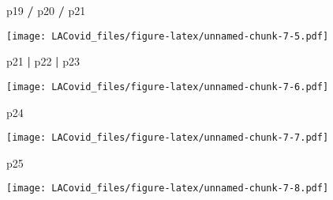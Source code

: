 \documentclass[
]{article}
\newenvironment{Shaded}{\begin{snugshade}}{\end{snugshade}}
\newcommand{\NormalTok}[1]{#1}
\newcommand{\OperatorTok}[1]{\textcolor[rgb]{0.81,0.36,0.00}{\textbf{#1}}}
\newcommand{\StringTok}[1]{\textcolor[rgb]{0.31,0.60,0.02}{#1}}
\begin{document}
\begin{Shaded}
\begin{Highlighting}[]
\NormalTok{p19 }\OperatorTok{/}\StringTok{ }\NormalTok{p20 }\OperatorTok{/}\StringTok{ }\NormalTok{p21}
\end{Highlighting}
\end{Shaded}

\texttt{[image: LACovid\_files/figure-latex/unnamed-chunk-7-5.pdf]}

\begin{Shaded}
\begin{Highlighting}[]
\NormalTok{p21 }\OperatorTok{|}\StringTok{ }\NormalTok{p22 }\OperatorTok{|}\StringTok{ }\NormalTok{p23}
\end{Highlighting}
\end{Shaded}

\texttt{[image: LACovid\_files/figure-latex/unnamed-chunk-7-6.pdf]}

\begin{Shaded}
\begin{Highlighting}[]
\NormalTok{p24}
\end{Highlighting}
\end{Shaded}

\texttt{[image: LACovid\_files/figure-latex/unnamed-chunk-7-7.pdf]}

\begin{Shaded}
\begin{Highlighting}[]
\NormalTok{p25}
\end{Highlighting}
\end{Shaded}

\texttt{[image: LACovid\_files/figure-latex/unnamed-chunk-7-8.pdf]}
\end{document}
